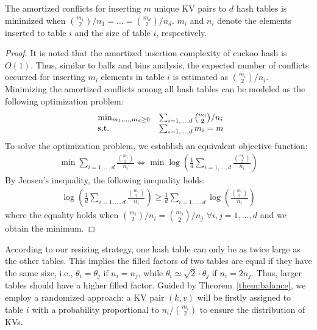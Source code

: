 \begin{theorem}\label{them:balance}
	The amortized conflicts for inserting $m$ unique KV pairs to $d$ hash tables is minimized when $\binom{m_1}{2}/n_1 = \ldots = \binom{m_d}{2}/n_d$. 
	$m_i$ and $n_i$ denote the elements inserted to table $i$ and the size of table $i$, respectively.  
\end{theorem}
\begin{proof}
	It is noted that the amortized insertion complexity of cuckoo hash is $O(1)$. Thus, similar to balls and bins analysis, the expected number of conflicts occurred for inserting $m_i$ elements in table $i$ is estimated as $\binom{m_i}{2}/n_i$. Minimizing the amortized conflicts among all hash tables can be modeled as the following optimization problem:
	\begin{equation}\label{eq:conflict-min}
	\begin{array}{ll@{}ll}
	\min_{m_1,\ldots,m_d \geq 0} & \sum_{i=1,\ldots,d} \binom{m_i}{2}/n_i \\
	\text{s.t.} & \sum_{i=1,\ldots,d} m_i = m
	\end{array}
	\end{equation}
	To solve the optimization problem, we establish an equivalent objective function:
	\begin{align*}
	\min \sum_{i=1,\ldots,d} \frac{\binom{m_i}{2}}{n_i} \Leftrightarrow \min \log(\frac{1}{d}\sum_{i=1,\ldots,d} \frac{\binom{m_i}{2}}{n_i})
	\end{align*}
	By Jensen's inequality, the following inequality holds:
	\begin{align*}
	\log(\frac{1}{d}\sum_{i=1,\ldots,d} \frac{\binom{m_i}{2}}{n_i}) \geq \frac{1}{d}\sum_{i=1,\ldots,d}\log(\frac{\binom{m_i}{2}}{n_i})
	\end{align*}
	where the equality holds when $\binom{m_i}{2}/n_i = \binom{m_j}{2}/n_j$ $\forall i,j = 1,\ldots,d$ and we obtain the minimum.
\end{proof}

According to our resizing strategy, one hash table can only be as twice large as the other tables. 
This implies the filled factors of two tables are equal if they have the same size, i.e., $\theta_i = \theta_j$ if $n_i = n_j$, 
while $\theta_i \simeq \sqrt{2}\cdot \theta_j$ if $n_i = 2n_j$. 
Thus, larger tables should have a higher filled factor. 
Guided by Theorem~\ref{them:balance},
we employ a randomized approach: 
a KV pair $(k,v)$ will be firstly assigned to table $i$ with a probability proportional to $n_i/\binom{m_i}{2}$ to ensure the distribution of KVs.

